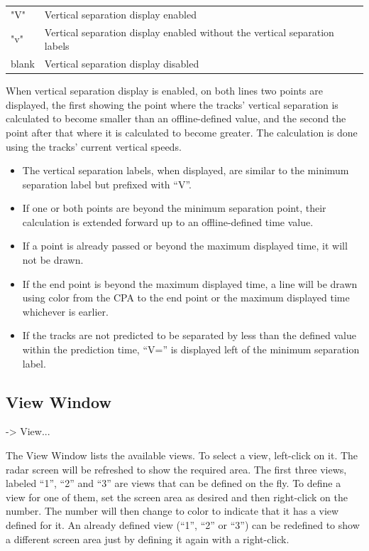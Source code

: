 \documentclass[a4paper,oneside,11pt]{memoir}
\begin{document}
\begin{longtable}{p{5cm} p{7.5cm}}
  "V"   & Vertical separation display enabled\\
  "v"   & Vertical separation display enabled without the vertical separation labels\\
  blank & Vertical separation display disabled\\
\end{longtable}

When vertical separation display is enabled, on both lines two points are displayed, the first showing the point where the tracks’ vertical separation is calculated to become smaller than an offline-defined value, and the second the point after that where it is calculated to become greater. The calculation is done using the tracks’ current vertical speeds.

\begin{itemize}
    \item The vertical separation labels, when displayed, are similar to the minimum separation label but prefixed with “V”.
    \item If one or both points are beyond the minimum separation point, their calculation is extended forward up to an offline-defined time value.
    \item If a point is already passed or beyond the maximum displayed time, it will not be drawn.
    \item If the end point is beyond the maximum displayed time, a line will be drawn using  color from the CPA to the end point or the maximum displayed time whichever is earlier.
    \item If the tracks are not predicted to be separated by less than the defined value within the prediction time, “V=” is displayed left of the minimum separation label.
\end{itemize}

\subsection{View Window}
\label{win:view}
 -> View...

\bigskip


The View Window lists the available views. To select a view, left-click on it. The radar screen will be refreshed to show the required area. The first three views, labeled “1”, “2” and “3” are views that can be defined on the fly. To define a view for one of them, set the screen area as desired and then right-click on the number. The number will then change to  color to indicate that it has a view defined for it. An already defined view (“1”, “2” or “3”) can be redefined to show a different screen area just by defining it again with a right-click.
\end{document}
